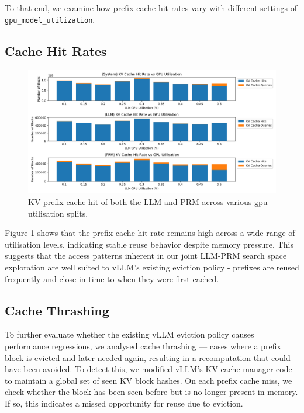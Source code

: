 \documentclass[12pt,twoside]{report}
\begin{document}
To that end, we examine how prefix cache hit rates vary with different settings of \texttt{gpu\_model\_utilization}.

\subsection{Cache Hit Rates}
\begin{figure}[htbp]
\centering
\includegraphics[width=\textwidth]{figures/kv_cache_hit_rate.pdf}
\caption{KV prefix cache hit of both the LLM and PRM across various gpu utilisation splits.}
\label{fig:kv_cache_hit_rate}
\end{figure}

Figure \ref{fig:kv_cache_hit_rate} shows that the prefix cache hit rate remains high across a wide range of utilisation levels, indicating stable reuse behavior despite memory pressure. 
This suggests that the access patterns inherent in our joint LLM-PRM search space exploration are well suited to vLLM's existing eviction policy - prefixes are reused frequently and close in time to when they were first cached.

\subsection{Cache Thrashing}
To further evaluate whether the existing vLLM eviction policy causes performance regressions, we analysed cache thrashing — cases where a prefix block is evicted and later needed again, resulting in a recomputation that could have been avoided. 
To detect this, we modified vLLM's KV cache manager code to maintain a global set of seen KV block hashes. 
On each prefix cache miss, we check whether the block has been seen before but is no longer present in memory. 
If so, this indicates a missed opportunity for reuse due to eviction.
\end{document}
